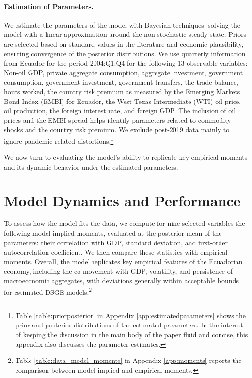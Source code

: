 \documentclass[12pt]{article}
\begin{document}
\paragraph{Estimation of Parameters.}
We estimate the parameters of the model with Bayesian techniques, solving the model with a linear approximation around the non-stochastic steady state. Priors are selected based on standard values in the literature and economic plausibility, ensuring convergence of the posterior distributions. We use quarterly information from Ecuador for the period 2004:Q1:Q4 for the following 13 observable variables: Non-oil GDP, private aggregate consumption, aggregate investment, government consumption, government investment, government transfers, the trade balance, hours worked, the country risk premium as measured by the Emerging Markets Bond Index (EMBI) for Ecuador, the West Texas Intermediate (WTI) oil price, oil production, the foreign interest rate, and foreign GDP. The inclusion of oil prices and the EMBI spread helps identify parameters related to commodity shocks and the country risk premium. We exclude post-2019 data mainly to ignore pandemic-related distortions.\footnote{Table \ref{table:priorposterior} in Appendix \ref{app:estimatedparameters} shows the prior and posterior distributions of the estimated parameters. In the interest of keeping the discussion in the main body of the paper fluid and concise, this appendix also discusses the parameter estimates.}

We now turn to evaluating the model’s ability to replicate key empirical moments and its dynamic behavior under the estimated parameters.


\section{Model Dynamics and Performance}\label{sec:performance}

To assess how the model fits the data, we compute for nine selected variables the following model-implied moments, evaluated at the posterior mean of the parameters: their correlation with GDP, standard deviation, and first-order autocorrelation coefficient. We then compare these statistics with empirical moments. Overall, the model replicates key empirical features of the Ecuadorian economy, including the co-movement with GDP, volatility, and persistence of macroeconomic aggregates, with deviations generally within acceptable bounds for estimated DSGE models.\footnote{Table \ref{table:data_model_moments} in Appendix \ref{app:moments} reports the comparison between model-implied and empirical moments.}
\end{document}
